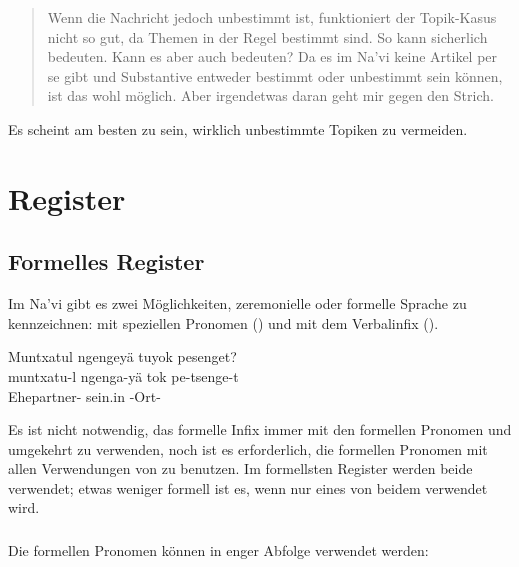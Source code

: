 \begin{quote}Wenn die Nachricht jedoch unbestimmt ist, funktioniert der Topik-Kasus nicht so gut, da Themen in der Regel bestimmt sind. So kann  sicherlich  bedeuten. Kann es aber auch  bedeuten? Da es im Na'vi keine Artikel per se gibt und Substantive entweder bestimmt oder unbestimmt sein können, ist das wohl möglich. Aber irgendetwas daran geht mir gegen den Strich.
\end{quote}

\noindent Es scheint am besten zu sein, wirklich unbestimmte Topiken zu vermeiden.

\section{Register}

\subsection{Formelles Register} Im Na'vi gibt es zwei Möglichkeiten, zeremonielle oder formelle Sprache zu kennzeichnen: mit speziellen Pronomen () und mit dem Verbalinfix  ().

\begin{interlin}
\glll \Npawl{}Muntxatul ngengeyä tuyok pesenget? \\
   muntxatu-l ngenga-yä tok pe-tsenge-t \\
   Ehepartner-  sein.in -Ort-\\
\end{interlin}

\noindent Es ist nicht notwendig, das formelle Infix  immer mit den formellen Pronomen und umgekehrt zu verwenden, noch ist es erforderlich, die formellen Pronomen mit allen Verwendungen von  zu benutzen. Im formellsten Register werden beide verwendet; etwas weniger formell ist es, wenn nur eines von beidem verwendet wird.

\subsubsection{} Die formellen Pronomen können in enger Abfolge verwendet werden: 

